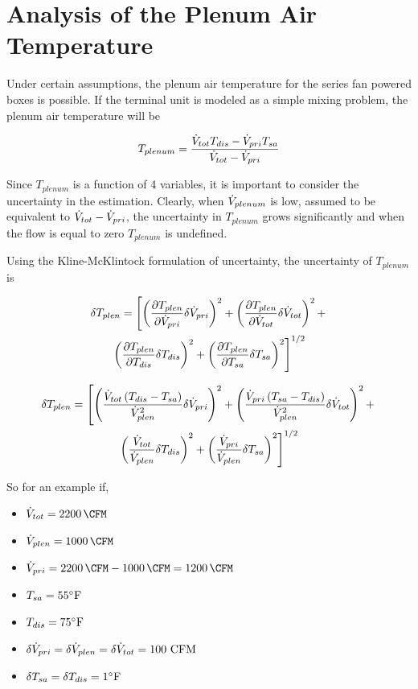 \section{Analysis of the Plenum Air Temperature}

Under certain assumptions, the plenum air temperature for the series fan powered boxes is possible. If the terminal unit is modeled as a simple mixing problem, the plenum air temperature will be 

\begin{equation}
    T_{plenum}=\frac{\dot{V}_{tot}T_{dis}-\dot{V}_{pri}T_{sa}}{\dot{V}_{tot} -\dot{V}_{pri}}
\end{equation}

Since \(T_{plenum}\) is a function of 4 variables, it is important to consider the uncertainty in the estimation. Clearly, when \(\dot{V}_{plenum}\) is low, assumed to be equivalent to \(\dot{V}_{tot} - \dot{V}_{pri}\), the uncertainty in  \(T_{plenum}\) grows significantly and when the flow is equal to zero \(T_{plenum}\) is undefined. 

Using the Kline-McKlintock formulation of uncertainty, the uncertainty of \(T_{plenum}\) is 

\begin{multline}
    \delta T_{plen} = \left[\left( \pdv{T_{plen}}{\dot{V}_{pri}} \delta \dot{V}_{pri}   \right)^2  +\left( \pdv{T_{plen}}{\dot{V}_{tot}} \delta \dot{V}_{tot}   \right)^2 + \right. \\
    \left. \left( \pdv{T_{plen}}{T_{dis}} \delta T_{dis}   \right)^2 + \left( \pdv{T_{plen}}{T_{sa}} \delta T_{sa}   \right)^2  \right]^{1/2}
\end{multline}

\begin{multline}\label{eq:plenumUncertainty}
    \delta T_{plen} = \left[\left(  \frac{\dot{V}_{tot}\left(T_{dis}-T_{sa} \right)}{{\dot{V}_{plen}}^2}   \delta \dot{V}_{pri} \right)^2  +\left(\frac{\dot{V}_{pri}\left(T_{sa}-T_{dis} \right)}{{\dot{V}_{plen}}^2}      \delta \dot{V}_{tot}   \right)^2 + \right. \\
    \left. \left( \frac{\dot{V}_{tot}}{\dot{V}_{plen}} \delta T_{dis}   \right)^2 + \left(\frac{\dot{V}_{pri}}{\dot{V}_{plen}}  \delta T_{sa}   \right)^2  \right]^{1/2}
\end{multline}

So for an example if, 

\newcommand{\flowtotvalue}{\SI{2200}{\CFM}}
\newcommand{\plenflowvalue}{\SI{1000}{\CFM}}

\begin{itemize}
    \item \(\totflow{}=\flowtotvalue\)
    \item \(\plenflow{}=\plenflowvalue\)
    \item \(\priflow=\flowtotvalue - \plenflowvalue = \SI{1200}{\CFM} \)
    \item \(T_{sa} = 55^{\circ}\text{F} \)
    \item \(T_{dis} = 75^{\circ}\text{F} \)
    \item \(\delta\dot{V}_{pri}{}=\delta\dot{V}_{plen}=\delta\dot{V}_{tot}=100 \text{ CFM}\)
    \item \(\delta T_{sa} = \delta T_{dis} = 1^{\circ} \text{F} \)
\end{itemize}

